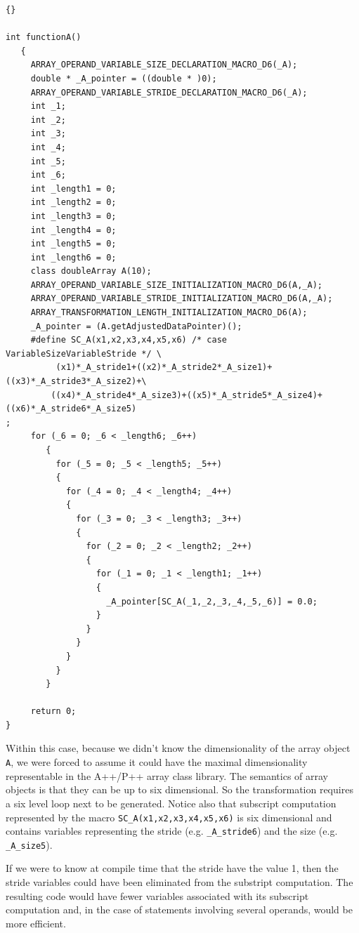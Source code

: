\documentclass[10pt]{article}
\begin{document}
\begin{lstlisting}{}

int functionA()
   { 
     ARRAY_OPERAND_VARIABLE_SIZE_DECLARATION_MACRO_D6(_A); 
     double * _A_pointer = ((double * )0); 
     ARRAY_OPERAND_VARIABLE_STRIDE_DECLARATION_MACRO_D6(_A); 
     int _1; 
     int _2; 
     int _3; 
     int _4; 
     int _5; 
     int _6; 
     int _length1 = 0; 
     int _length2 = 0; 
     int _length3 = 0; 
     int _length4 = 0; 
     int _length5 = 0; 
     int _length6 = 0;
     class doubleArray A(10);
     ARRAY_OPERAND_VARIABLE_SIZE_INITIALIZATION_MACRO_D6(A,_A); 
     ARRAY_OPERAND_VARIABLE_STRIDE_INITIALIZATION_MACRO_D6(A,_A); 
     ARRAY_TRANSFORMATION_LENGTH_INITIALIZATION_MACRO_D6(A); 
     _A_pointer = (A.getAdjustedDataPointer)(); 
     #define SC_A(x1,x2,x3,x4,x5,x6) /* case VariableSizeVariableStride */ \
          (x1)*_A_stride1+((x2)*_A_stride2*_A_size1)+((x3)*_A_stride3*_A_size2)+\
         ((x4)*_A_stride4*_A_size3)+((x5)*_A_stride5*_A_size4)+((x6)*_A_stride6*_A_size5)
; 
     for (_6 = 0; _6 < _length6; _6++)
        { 
          for (_5 = 0; _5 < _length5; _5++)
          { 
            for (_4 = 0; _4 < _length4; _4++)
            { 
              for (_3 = 0; _3 < _length3; _3++)
              { 
                for (_2 = 0; _2 < _length2; _2++)
                { 
                  for (_1 = 0; _1 < _length1; _1++)
                  { 
                    _A_pointer[SC_A(_1,_2,_3,_4,_5,_6)] = 0.0; 
                  } 
                } 
              } 
            } 
          } 
        } 

     return 0;
} 

\end{lstlisting}

Within this case, because we didn't know the dimensionality of the array object {\tt A}, we were
forced to assume it could have the maximal dimensionality representable in the A++/P++ array class
library.  The semantics of array objects is that they can be up to six dimensional.  So the
transformation requires a six level loop next to be generated.  Notice also that subscript
computation represented by the macro {\tt SC\_A(x1,x2,x3,x4,x5,x6)} is six dimensional and contains
variables representing the stride (e.g. {\tt \_A\_stride6}) and the size (e.g. {\tt \_A\_size5}).

If we were to know at compile time that the stride have the value 1, then the stride variables could
have been eliminated from the substript computation.  The resulting code would have fewer variables
associated with its subscript computation and, in the case of statements involving several operands,
would be more efficient.
\end{document}
